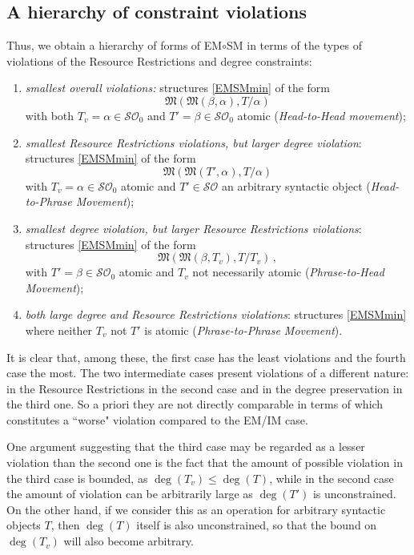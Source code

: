 \documentclass[12pt]{amsart}
\numberwithin{equation}{section}
\def\cO{{\mathcal O}}
\def\cS{{\mathcal S}}
\def\fM{{\mathfrak M}}
\begin{document}
\subsection{A hierarchy of constraint violations} 
Thus, we obtain a hierarchy of forms of EM$\circ$SM in terms of the
types of violations of the Resource Restrictions
and degree constraints:
\begin{enumerate}
\item {\em smallest overall violations:}  structures  \eqref{EMSMmin} of the form
$$ \fM( \fM(\beta, \alpha), T/\alpha ) $$
with both $T_v=\alpha \in \cS\cO_0$ and $T'=\beta \in \cS\cO_0$ atomic ({\em Head-to-Head movement});
\item {\em smallest Resource Restrictions violations, but larger degree violation}:
 structures  \eqref{EMSMmin} of the form
$$ \fM(\fM(T',\alpha), T/\alpha) $$
with $T_v=\alpha \in \cS\cO_0$ atomic and $T' \in \cS\cO$ an arbitrary syntactic object 
({\em Head-to-Phrase Movement});
\item  {\em smallest degree violation, but larger Resource
Restrictions violations}: 
structures  \eqref{EMSMmin} of the form
$$ \fM(\fM(\beta, T_v), T/T_v)\, , $$ 
with $T'=\beta \in \cS\cO_0$ atomic and $T_v$ not necessarily atomic ({\em Phrase-to-Head Movement});
\item {\em both large degree and Resource Restrictions violations}: structures  \eqref{EMSMmin}
where neither $T_v$ not $T'$ is atomic ({\em Phrase-to-Phrase Movement}). 
\end{enumerate}

\smallskip

It is clear that, among these, the first case has the least violations and
the fourth case the most. The two intermediate cases present violations
of a different nature: in the Resource Restrictions in the second case
and in the degree preservation in the third one. So a priori they are
not directly comparable in terms of which constitutes a ``worse" 
violation compared to the EM/IM case. 

One argument suggesting that the third case may be
regarded as a lesser violation than the second one is
the fact that the amount of possible violation in the third
case is bounded, as $\deg(T_v)\leq \deg(T)$, while
in the second case the amount of violation can be
arbitrarily large as $\deg(T')$ is unconstrained. On the
other hand, if we consider this as an operation for arbitrary
syntactic objects $T$, then $\deg(T)$ itself is also unconstrained,
so that the bound on $\deg(T_v)$ will also become arbitrary. 
\end{document}
